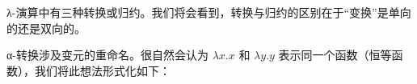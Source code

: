 \documentclass[../../../include/open-logic-section]{subfiles}
\begin{document}

λ-演算中有三种转换或归约。我们将会看到，转换与归约的区别在于“变换”是单向的还是双向的。

α-转换涉及变元的重命名。很自然会认为 $\lambda x.x$ 和 $\lambda y.y$ 表示同一个函数（恒等函数），我们将此想法形式化如下：
\end{document}
